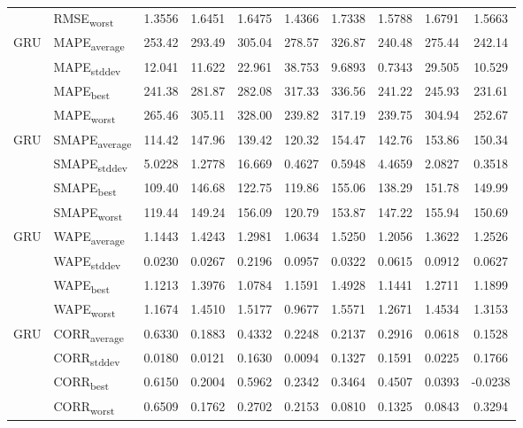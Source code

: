 {\begin{longtable}{l l c c c c c c c c}
 & RMSE\textsubscript{worst} & 1.3556 & 1.6451 & 1.6475 & 1.4366 & 1.7338 & 1.5788 & 1.6791 & 1.5663 \\
\cmidrule(lr){2-10}
\multirow{4}{*}{GRU} & MAPE\textsubscript{average} & 253.42 & 293.49 & 305.04 & 278.57 & 326.87 & 240.48 & 275.44 & 242.14 \\
 & MAPE\textsubscript{stddev} & 12.041 & 11.622 & 22.961 & 38.753 & 9.6893 & 0.7343 & 29.505 & 10.529 \\
 & MAPE\textsubscript{best} & 241.38 & 281.87 & 282.08 & 317.33 & 336.56 & 241.22 & 245.93 & 231.61 \\
 & MAPE\textsubscript{worst} & 265.46 & 305.11 & 328.00 & 239.82 & 317.19 & 239.75 & 304.94 & 252.67 \\
\cmidrule(lr){2-10}
\multirow{4}{*}{GRU} & SMAPE\textsubscript{average} & 114.42 & 147.96 & 139.42 & 120.32 & 154.47 & 142.76 & 153.86 & 150.34 \\
 & SMAPE\textsubscript{stddev} & 5.0228 & 1.2778 & 16.669 & 0.4627 & 0.5948 & 4.4659 & 2.0827 & 0.3518 \\
 & SMAPE\textsubscript{best} & 109.40 & 146.68 & 122.75 & 119.86 & 155.06 & 138.29 & 151.78 & 149.99 \\
 & SMAPE\textsubscript{worst} & 119.44 & 149.24 & 156.09 & 120.79 & 153.87 & 147.22 & 155.94 & 150.69 \\
\cmidrule(lr){2-10}
\multirow{4}{*}{GRU} & WAPE\textsubscript{average} & 1.1443 & 1.4243 & 1.2981 & 1.0634 & 1.5250 & 1.2056 & 1.3622 & 1.2526 \\
 & WAPE\textsubscript{stddev} & 0.0230 & 0.0267 & 0.2196 & 0.0957 & 0.0322 & 0.0615 & 0.0912 & 0.0627 \\
 & WAPE\textsubscript{best} & 1.1213 & 1.3976 & 1.0784 & 1.1591 & 1.4928 & 1.1441 & 1.2711 & 1.1899 \\
 & WAPE\textsubscript{worst} & 1.1674 & 1.4510 & 1.5177 & 0.9677 & 1.5571 & 1.2671 & 1.4534 & 1.3153 \\
\cmidrule(lr){2-10}
\multirow{4}{*}{GRU} & CORR\textsubscript{average} & 0.6330 & 0.1883 & 0.4332 & 0.2248 & 0.2137 & 0.2916 & 0.0618 & 0.1528 \\
 & CORR\textsubscript{stddev} & 0.0180 & 0.0121 & 0.1630 & 0.0094 & 0.1327 & 0.1591 & 0.0225 & 0.1766 \\
 & CORR\textsubscript{best} & 0.6150 & 0.2004 & 0.5962 & 0.2342 & 0.3464 & 0.4507 & 0.0393 & -0.0238 \\
 & CORR\textsubscript{worst} & 0.6509 & 0.1762 & 0.2702 & 0.2153 & 0.0810 & 0.1325 & 0.0843 & 0.3294 \\

\end{longtable}}
